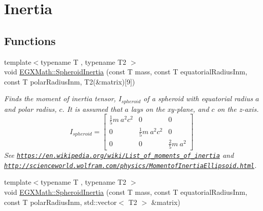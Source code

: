 \hypertarget{group___e_g_x_math-_geometry-3_d-_spheroid-_inertia}{}\section{Inertia}
\label{group___e_g_x_math-_geometry-3_d-_spheroid-_inertia}
\subsection*{Functions}
\begin{DoxyCompactItemize}
\item 
{\footnotesize template$<$typename T , typename T2 $>$ }\\void \mbox{\hyperlink{group___e_g_x_math-_geometry-3_d-_spheroid-_inertia_ga4a6085f1b3504bd682ee6818542ae09e}{E\+G\+X\+Math\+::\+Spheroid\+Inertia}} (const T mass, const T equatorial\+Radius\+Inm, const T polar\+Radius\+Inm, T2(\&matrix)\mbox{[}9\mbox{]})
\begin{DoxyCompactList}\small\item\em Finds the moment of inertia tensor, $I_{spheroid}$ of a spheroid with equatorial radius $a$ and polar radius, $c$. It is assumed that $a$ lays on the xy-\/plane, and $c$ on the z-\/axis. \[ I_{spheroid}=\begin{bmatrix} \frac{1}{5}m\ a^2c^2 & 0 & 0\\ 0 & \frac{1}{5}m\ a^2c^2 & 0\\ 0 & 0 & \frac{2}{5}m\ a^2 \end{bmatrix} \] See \href{https://en.wikipedia.org/wiki/List_of_moments_of_inertia}{\tt https\+://en.\+wikipedia.\+org/wiki/\+List\+\_\+of\+\_\+moments\+\_\+of\+\_\+inertia} and \href{http://scienceworld.wolfram.com/physics/MomentofInertiaEllipsoid.html}{\tt http\+://scienceworld.\+wolfram.\+com/physics/\+Momentof\+Inertia\+Ellipsoid.\+html}. \end{DoxyCompactList}\item 
{\footnotesize template$<$typename T , typename T2 $>$ }\\void \mbox{\hyperlink{group___e_g_x_math-_geometry-3_d-_spheroid-_inertia_ga116b896696bbcc8d65d60ec5fc0210a0}{E\+G\+X\+Math\+::\+Spheroid\+Inertia}} (const T mass, const T equatorial\+Radius\+Inm, const T polar\+Radius\+Inm, std\+::vector$<$ T2 $>$ \&matrix)

\end{DoxyCompactItemize}

